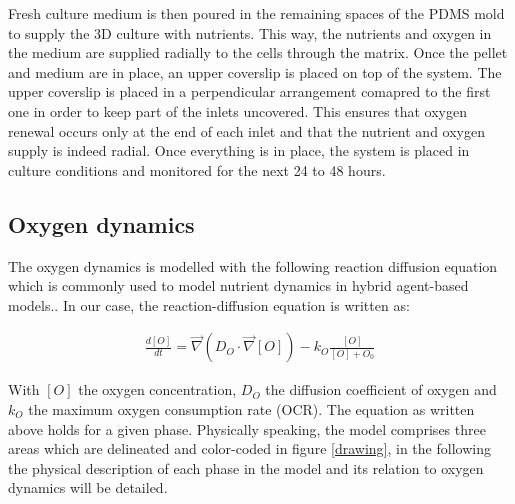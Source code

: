 \documentclass[11pt,a4paper]{article}
\begin{document}
Fresh culture medium is then poured in the remaining spaces of the PDMS mold to supply the 3D culture with nutrients. This way, the nutrients and oxygen in the medium are supplied radially to the cells through the matrix. Once the pellet and medium are in place, an upper coverslip is placed on top of the system. The upper coverslip is placed in a perpendicular arrangement comapred to the first one in order to keep part of the inlets uncovered. This ensures that oxygen renewal occurs only at the end of each inlet and that the nutrient and oxygen supply is indeed radial. Once everything is in place, the system is placed in culture conditions and monitored for the next 24 to 48 hours.


\subsection{Oxygen dynamics}
The oxygen dynamics is modelled with the following reaction diffusion equation which is commonly used to model nutrient dynamics in hybrid agent-based models.\cite{Mao2018}\cite{Kempf2005}\cite{Bull2020}. In our case, the reaction-diffusion equation is written as:

\begin{align}
\label{eqn:O} \frac{d [O]}{d t} = \overrightarrow{\nabla} (D_O \cdot \overrightarrow{\nabla} [O]) - k_O \frac{[O]}{[O] + O_0}  
\end{align}

With $[O]$ the oxygen concentration, $D_O$ the diffusion coefficient of oxygen and $k_O$ the maximum oxygen consumption rate (OCR). The equation as written above holds for a given phase. Physically speaking, the model comprises three areas which are delineated and color-coded in figure \ref{drawing}, in the following the physical description of each phase in the model and its relation to oxygen dynamics will be detailed.
\end{document}
